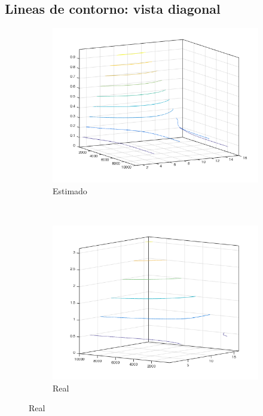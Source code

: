 \documentclass[12pt,letterpaper]{article}
\begin{document}
\subsection{Lineas de contorno: vista diagonal}
\begin{figure}[!h]
        \centering
        \begin{subfigure}[h]{0.45\textwidth}
                \includegraphics[width=\textwidth]{estimado_diagonal}
                \caption{Estimado}
                \label{fig:gull}
        \end{subfigure}
        ~
        \begin{subfigure}[h]{0.45\textwidth}
                \includegraphics[width=\textwidth]{real_diagonal}
                \caption{Real}
                \label{fig:tiger}
        \end{subfigure}
\end{figure}
\end{document}

